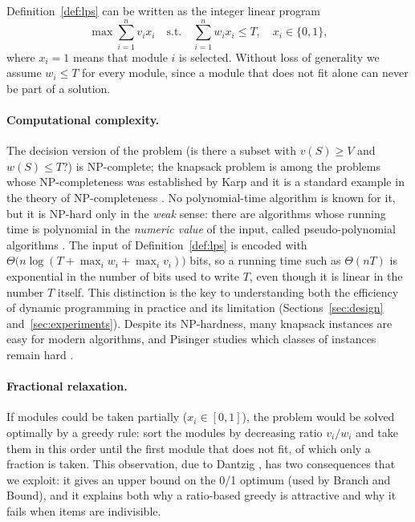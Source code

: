 Definition~\ref{def:lps} can be written as the integer linear program
\begin{equation}
\max \sum_{i=1}^{n} v_i x_i \quad \text{s.t.}\quad \sum_{i=1}^{n} w_i x_i \le T,\quad x_i \in \{0,1\},
\label{eq:ilp}
\end{equation}
where $x_i=1$ means that module $i$ is selected. Without loss of generality we assume $w_i \le T$ for every module, since a module that does not fit alone can never be part of a solution.

\paragraph{Computational complexity.} The decision version of the problem (is there a subset with $v(S)\ge V$ and $w(S)\le T$?) is NP-complete; the knapsack problem is among the problems whose NP-completeness was established by Karp \cite{karp1972} and it is a standard example in the theory of NP-completeness \cite{garey1979}. No polynomial-time algorithm is known for it, but it is NP-hard only in the \emph{weak} sense: there are algorithms whose running time is polynomial in the \emph{numeric value} of the input, called pseudo-polynomial algorithms \cite{garey1979,kellerer2004}. The input of Definition~\ref{def:lps} is encoded with $\Theta\big(n \log(T+\max_i w_i+\max_i v_i)\big)$ bits, so a running time such as $\Theta(nT)$ is exponential in the number of bits used to write $T$, even though it is linear in the number $T$ itself. This distinction is the key to understanding both the efficiency of dynamic programming in practice and its limitation (Sections~\ref{sec:design} and~\ref{sec:experiments}). Despite its NP-hardness, many knapsack instances are easy for modern algorithms, and Pisinger studies which classes of instances remain hard \cite{pisinger2005}.

\paragraph{Fractional relaxation.} If modules could be taken partially ($x_i\in[0,1]$), the problem would be solved optimally by a greedy rule: sort the modules by decreasing ratio $v_i/w_i$ and take them in this order until the first module that does not fit, of which only a fraction is taken. This observation, due to Dantzig \cite{dantzig1957}, has two consequences that we exploit: it gives an upper bound on the 0/1 optimum (used by Branch and Bound), and it explains both why a ratio-based greedy is attractive and why it fails when items are indivisible.

